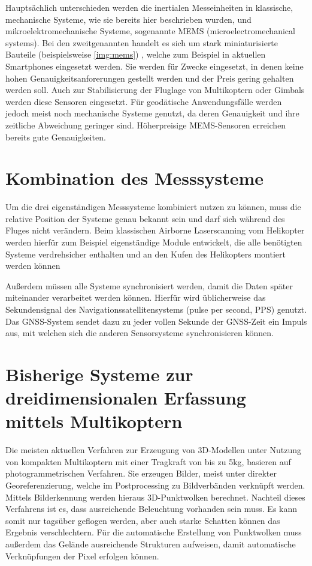 \documentclass[a4paper,12pt,bibliography=totoc, listof=totoc,titlepage,pointlessnumbers]{scrreprt}
\begin{document}
Hauptsächlich unterschieden werden die inertialen Messeinheiten in klassische, mechanische Systeme, wie sie bereits hier beschrieben wurden, und mikroelektromechanische Systeme, sogenannte MEMS (microelectromechanical systems). Bei den zweitgenannten handelt es sich um stark miniaturisierte Bauteile (beispielsweise \autoref{img:mems}) , welche zum Beispiel in aktuellen Smartphones eingesetzt werden. Sie werden für Zwecke eingesetzt, in denen keine hohen Genauigkeitsanforerungen gestellt werden und der Preis gering gehalten werden soll. Auch zur Stabilisierung der Fluglage von Multikoptern oder Gimbals werden diese Sensoren eingesetzt. Für geodätische Anwendungsfälle werden jedoch meist noch mechanische Systeme genutzt, da deren Genauigkeit und ihre zeitliche Abweichung geringer sind. Höherpreisige MEMS-Sensoren erreichen bereits gute Genauigkeiten.


\section{Kombination des Messsysteme}
Um die drei eigenständigen Messsysteme kombiniert nutzen zu können, muss die relative Position der Systeme genau bekannt sein und darf sich während des Fluges nicht verändern. Beim klassischen Airborne Laserscanning vom Helikopter werden hierfür zum Beispiel eigenständige Module entwickelt, die alle benötigten Systeme verdrehsicher enthalten und an den Kufen des Helikopters montiert werden können \citep[S. 23f]{beraldin}

Außerdem müssen alle Systeme synchronisiert werden, damit die Daten später miteinander verarbeitet werden können. Hierfür wird üblicherweise das Sekundensignal des Navigationssatellitensystems (pulse per second, PPS) genutzt. Das GNSS-System sendet dazu zu jeder vollen Sekunde der GNSS-Zeit ein Impuls aus, mit welchen sich die anderen Sensorsysteme synchronisieren können. 

\section{Bisherige Systeme zur dreidimensionalen Erfassung mittels Multikoptern}
Die meisten aktuellen Verfahren zur Erzeugung von 3D-Modellen unter Nutzung von kompakten Multikoptern mit einer Tragkraft von bis zu 5kg, basieren auf photogrammetrischen Verfahren. Sie erzeugen Bilder, meist unter direkter Georeferenzierung, welche im Postprocessing zu Bildverbänden verknüpft werden. Mittels Bilderkennung werden hieraus 3D-Punktwolken berechnet. Nachteil dieses Verfahrens ist es, dass ausreichende Beleuchtung vorhanden sein muss. Es kann somit nur tagsüber geflogen werden, aber auch starke Schatten können das Ergebnis verschlechtern. Für die automatische Erstellung von Punktwolken muss außerdem das Gelände ausreichende Strukturen aufweisen, damit automatische Verknüpfungen der Pixel erfolgen können.
\end{document}

